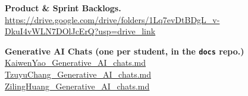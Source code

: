\documentclass[11pt,a4paper]{article}
\begin{document}
\vspace{0.5em}

\noindent\textbf{Product \& Sprint Backlogs.}\\
\url{https://drive.google.com/drive/folders/1Lq7evDtBDgL_v-DkuI4vWLN7DOlJcErQ?usp=drive_link}

\vspace{0.5em}

\noindent\textbf{Generative AI Chats (one per student, in the \texttt{docs} repo.)}\\
\href{https://github.com/ucdse/docs/blob/main/KaiwenYao_Generative_AI_chats.md}{KaiwenYao\_Generative\_AI\_chats.md}\\
\href{https://github.com/ucdse/docs/blob/main/TzuyuChang_Generative_AI_chats.md}{TzuyuChang\_Generative\_AI\_chats.md}\\
\href{https://github.com/ucdse/docs/blob/main/ZilingHuang_Generative_AI_chats.md}{ZilingHuang\_Generative\_AI\_chats.md}
\end{document}
